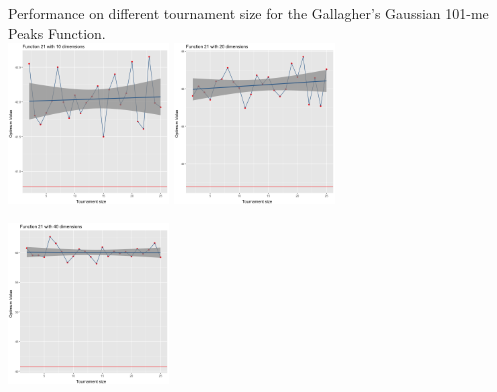 \documentclass[portrait,final,a0paper,fontscale=0.277]{baposter}
\begin{document}
\begin{poster}
{\begin{center}
				\large{Performance on different tournament size for the Gallagher’s Gaussian 101-me Peaks Function.}\\
				\raggedleft
				\includegraphics[width=0.32\textwidth]{21dim_10.png}
				\centering
				\includegraphics[width=0.32\textwidth]{21dim_20.png}
				\raggedright
				\includegraphics[width=0.32\textwidth]{21dim_40.png}
				
				
				
			\end{center}
			
			
			\vspace{-1.em}
		}
		

\end{poster}
\end{document}
